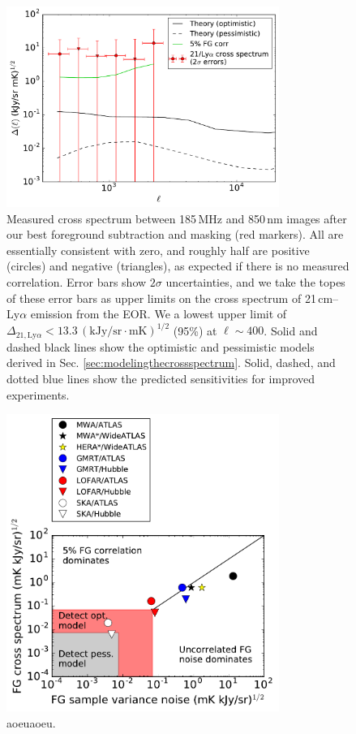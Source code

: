 \documentclass{emulateapj}
\begin{document}
\begin{figure}[h]
\centering
\includegraphics[width=3.5in]{images/mwa_atlas_xspec_with_2Dsimtheory_and_2sigma_errors_6bins.pdf}
\caption{Measured cross spectrum between 185\,MHz and 850\,nm images after our best foreground subtraction and masking (red markers). All are essentially consistent with zero, and roughly half are positive (circles) and negative (triangles), as expected if there is no measured correlation. Error bars show $2\sigma$ uncertainties, and we take the topes of these error bars as upper limits on the cross spectrum of 21\,cm--Ly$\alpha$ emission from the EOR. We a lowest upper limit of $\Delta_{21,\text{Ly}\alpha}<13.3\,(\text{kJy/sr}\cdot \text{mK})^{1/2}$ (95\%) at $\ell\sim400$. Solid and dashed black lines show the optimistic and pessimistic models derived in Sec. \ref{sec:modelingthecrossspectrum}. Solid, dashed, and dotted blue lines show the predicted sensitivities for improved experiments.}
\label{fig:resxspec}
\end{figure}

\begin{figure}[h]
\centering
\includegraphics[width=3.5in]{images/noise_vs_corr_expt_study.pdf}
\caption{aoeuaoeu.}
\label{fig:noisecorrstudy}
\end{figure}
\end{document}
